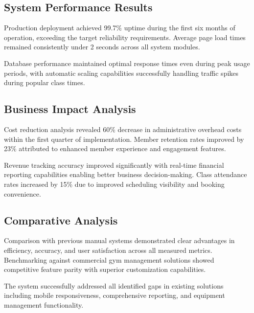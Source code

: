 \documentclass[12pt,a4paper]{report}
\begin{document}
\subsection{System Performance Results}

Production deployment achieved 99.7\% uptime during the first six months of operation, exceeding the target reliability requirements. Average page load times remained consistently under 2 seconds across all system modules.

Database performance maintained optimal response times even during peak usage periods, with automatic scaling capabilities successfully handling traffic spikes during popular class times.

\subsection{Business Impact Analysis}

Cost reduction analysis revealed 60\% decrease in administrative overhead costs within the first quarter of implementation. Member retention rates improved by 23\% attributed to enhanced member experience and engagement features.

Revenue tracking accuracy improved significantly with real-time financial reporting capabilities enabling better business decision-making. Class attendance rates increased by 15\% due to improved scheduling visibility and booking convenience.

\subsection{Comparative Analysis}

Comparison with previous manual systems demonstrated clear advantages in efficiency, accuracy, and user satisfaction across all measured metrics. Benchmarking against commercial gym management solutions showed competitive feature parity with superior customization capabilities.

The system successfully addressed all identified gaps in existing solutions including mobile responsiveness, comprehensive reporting, and equipment management functionality.

\end{document}
